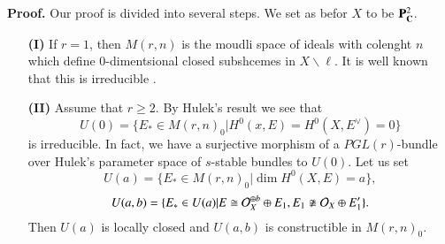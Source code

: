 \medskip
\noindent
{\bfseries Proof.} Our proof is divided into several steps. We set as befor $X$ to be $\mathbf{P}_{\mathbf{C}}^{2}$.

\begin{itemize}
\item[\bf(I)] If $r=1$, then $M(r,n)$ is the moudli space of ideals with colenght $n$ which define $0$-dimentsional closed subshcemes in $X\backslash \ell$. It is well known that this is irreducible \cite{art12-key2}.

\item[\bf(II)] Assume that $r \geq 2$. By Hulek's result we see that
$$
U(0)= \{E_{*} \in M (r, n)_{0} | H^{0}(x, E)=H^{0}(X, E^{\vee})= 0\}
$$
is irreducible. In fact, we have a surjective morphism of a $PGL(r)$-bundle over Hulek's parameter space of $s$-stable bundles to $U(0)$. Let us set
$$
U(a)=\{E_{*} \in M (r, n)_{0} | \dim H^{0}(X, E)= a\},
$$
$$
U(a, b) = \{E_{*} \in U(a) | E\cong \mathcal{O}_{X}^{\oplus b} \oplus E_{1}, E_{1} \ncong \mathcal{O}_{X}\oplus E_{1}'\}.
$$
Then $U(a)$ is locally closed and $U(a,b)$ is constructible in $M(r,n)_{0}$.


\end{itemize}
